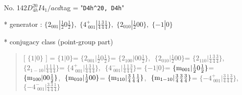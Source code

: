 \documentclass[fleqn,10pt,landscape]{jsarticle}
\begin{document}
\newpage

No. 142\quad$D_{4h}^{20}$\quad$I4_1/acd$\quad[ tetragonal ]
tag = "{\tt D4h^20, D4h}"

* generator : $\{2{}_{001}|\frac{1}{2} 0 \frac{1}{2}\},\,\,\{4^{+}_{\,\,001}|\frac{1}{4} \frac{3}{4} \frac{1}{4}\},\,\,\{2{}_{010}|\frac{1}{2} 0 0\},\,\,\{-1|0\}$

* conjugacy class (point-group part)
\begin{quote}
[ $\{1|0\}$ ] = \quad $\{1|0\}$ = \quad $\{2{}_{001}|\frac{1}{2} 0 \frac{1}{2}\}$\newline[ $\{2{}_{100}|0 0 \frac{1}{2}\}$ ] = \quad $\{2{}_{100}|0 0 \frac{1}{2}\}$,\,\, $\{2{}_{010}|\frac{1}{2} 0 0\}$ = \quad $\{2{}_{110}|\frac{1}{4} \frac{3}{4} \frac{3}{4}\}$,\,\, $\{2{}_{1-10}|\frac{1}{4} \frac{1}{4} \frac{1}{4}\}$ = \quad $\{4^{+}_{\,\,001}|\frac{1}{4} \frac{3}{4} \frac{1}{4}\}$,\,\, $\{4^{-}_{\,\,001}|\frac{1}{4} \frac{1}{4} \frac{3}{4}\}$\newline[ $\{-1|0\}$ ] = \quad $\{-1|0\}$ = \quad $\{{\rm m}_{001}|\frac{1}{2} 0 \frac{1}{2}\}$\newline[ $\{{\rm m}_{100}|0 0 \frac{1}{2}\}$ ] = \quad $\{{\rm m}_{100}|0 0 \frac{1}{2}\}$,\,\, $\{{\rm m}_{010}|\frac{1}{2} 0 0\}$ = \quad $\{{\rm m}_{110}|\frac{3}{4} \frac{1}{4} \frac{1}{4}\}$,\,\, $\{{\rm m}_{1-10}|\frac{3}{4} \frac{3}{4} \frac{3}{4}\}$ = \quad $\{-4^{+}_{\,\,001}|\frac{3}{4} \frac{1}{4} \frac{3}{4}\}$,\,\, $\{-4^{-}_{\,\,001}|\frac{3}{4} \frac{3}{4} \frac{1}{4}\}$\newline
\end{quote}
\end{document}
